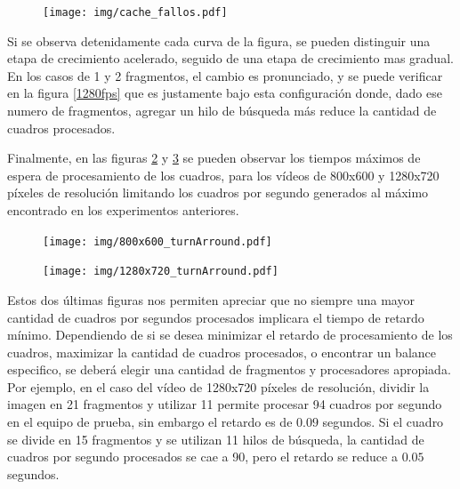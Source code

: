 \begin{figure}[!h]

	\texttt{[image: img/cache\_fallos.pdf]}
	\caption{}
	\label{cacheFallos}

\end{figure}

Si se observa detenidamente cada curva de la figura, se pueden distinguir una
etapa de crecimiento acelerado, seguido de una etapa de crecimiento mas gradual.
En los casos de 1 y 2 fragmentos, el cambio es pronunciado, y se puede verificar
en la figura \ref{1280fps} que es justamente bajo esta configuración donde, dado
ese numero de fragmentos, agregar un hilo de búsqueda más reduce la cantidad de
cuadros procesados.

Finalmente, en las figuras \ref{800turnArround} y \ref{1280turnArround} se
pueden observar los tiempos máximos de espera de procesamiento de los cuadros,
para los vídeos de 800x600 y 1280x720 píxeles de resolución limitando los
cuadros por segundo generados al máximo encontrado en los experimentos
anteriores.

\begin{figure}[!h]

	\texttt{[image: img/800x600\_turnArround.pdf]}
	\caption{}
	\label{800turnArround}

\end{figure}


\begin{figure}[!h]

	\texttt{[image: img/1280x720\_turnArround.pdf]}
	\caption{}
	\label{1280turnArround}

\end{figure}

Estos dos últimas figuras nos permiten apreciar que no siempre una mayor
cantidad de cuadros por segundos procesados implicara el tiempo de retardo
mínimo. Dependiendo de si se desea minimizar el retardo de procesamiento de los
cuadros, maximizar la cantidad de cuadros procesados, o encontrar un balance
especifico, se deberá elegir una cantidad de fragmentos y procesadores
apropiada. Por ejemplo, en el caso del vídeo de 1280x720 píxeles de resolución,
dividir la imagen en 21 fragmentos y utilizar 11 permite procesar 94 cuadros por
segundo en el equipo de prueba, sin embargo el retardo es de $0.09$ segundos. Si
el cuadro se divide en 15 fragmentos y se utilizan 11 hilos de búsqueda, la
cantidad de cuadros por segundo procesados se cae a 90, pero el retardo se
reduce a $0.05$ segundos.
